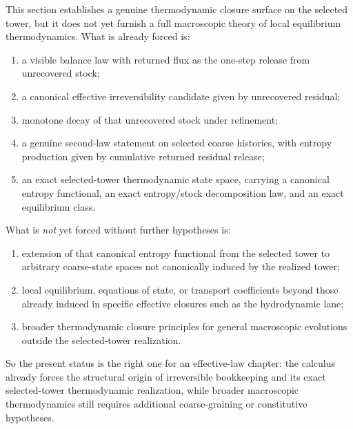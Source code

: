 \begin{remark}
\label{rem:thermodynamic-boundary}
This section establishes a genuine thermodynamic closure surface on the
selected tower, but it does not yet furnish a full macroscopic theory of local
equilibrium thermodynamics. What is already forced is:
\begin{enumerate}[label=(\roman*), leftmargin=2em, itemsep=0.2em]
\item a visible balance law with returned flux as the one-step release from
      unrecovered stock;
\item a canonical effective irreversibility candidate given by unrecovered
      residual;
\item monotone decay of that unrecovered stock under refinement;
\item a genuine second-law statement on selected coarse histories, with entropy
      production given by cumulative returned residual release;
\item an exact selected-tower thermodynamic state space, carrying a canonical
      entropy functional, an exact entropy/stock decomposition law, and an
      exact equilibrium class.
\end{enumerate}
What is \emph{not} yet forced without further hypotheses is:
\begin{enumerate}[label=(\roman*), leftmargin=2em, itemsep=0.2em]
\item extension of that canonical entropy functional from the selected tower to
      arbitrary coarse-state spaces not canonically induced by the realized
      tower;
\item local equilibrium, equations of state, or transport coefficients beyond
      those already induced in specific effective closures such as the
      hydrodynamic lane;
\item broader thermodynamic closure principles for general macroscopic
      evolutions outside the selected-tower realization.
\end{enumerate}
So the present status is the right one for an effective-law chapter: the
calculus already forces the structural origin of irreversible bookkeeping and
its exact selected-tower thermodynamic realization, while broader macroscopic
thermodynamics still requires additional coarse-graining or constitutive
hypotheses.
\end{remark}
